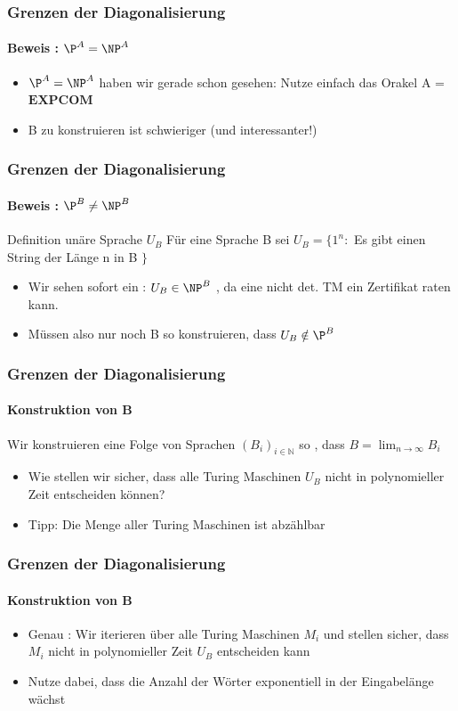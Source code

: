 \begin{frame}
	\frametitle{Grenzen der Diagonalisierung}
	\framesubtitle{Beweis : ${\P}^A = {\NP}^A$ }
	\begin{itemize}[<+->]
	
	\item ${\P}^A = {\NP}^A$ haben wir gerade schon gesehen:
			Nutze einfach das Orakel A = $\mathbf{EXPCOM}$
	\item B zu konstruieren ist schwieriger (und interessanter!)
	\end{itemize}	
\end{frame}

\begin{frame}
	\frametitle{Grenzen der Diagonalisierung}
	\framesubtitle{Beweis : ${\P}^B \neq {\NP}^B$}
	\begin{KITinfoblock}{Definition unäre Sprache $U_B$}
		Für eine Sprache B sei $U_B = \lbrace 1^n :$ Es gibt einen String
		der L\"ange n in B $\rbrace $
	\end{KITinfoblock}	
	\pause
	
	\begin{itemize}[<+->]
		\item Wir sehen sofort ein : $U_B \in {\NP}^B$ , da eine nicht det. TM
			ein Zertifikat raten kann.
		\item M\"ussen also nur noch B so konstruieren, dass $U_B \notin {\P}^B$
	\end{itemize}
\end{frame}

\begin{frame}
	\frametitle{Grenzen der Diagonalisierung}
	\framesubtitle{Konstruktion von B}
	Wir konstruieren eine Folge von Sprachen $(B_i)_{i \in \mathbb{N}}$ so , dass 
	$B = \lim_{n \to \infty} B_i$	
	\begin{itemize}[<+->]
		\item Wie stellen wir sicher, dass alle Turing Maschinen $U_B$ nicht
			in polynomieller Zeit entscheiden können?
		\item Tipp: Die Menge aller Turing Maschinen ist abzählbar
	\end{itemize}
\end{frame}

\begin{frame}
	\frametitle{Grenzen der Diagonalisierung}
	\framesubtitle{Konstruktion von B}
	\begin{itemize}[<+->]
	\item Genau : Wir iterieren über alle Turing Maschinen $M_i$ und stellen
	sicher, dass $M_i$ nicht in polynomieller Zeit $U_B$ entscheiden kann
	\item Nutze dabei, dass die Anzahl der Wörter exponentiell in der Eingabelänge wächst
	\end{itemize}
\end{frame}

